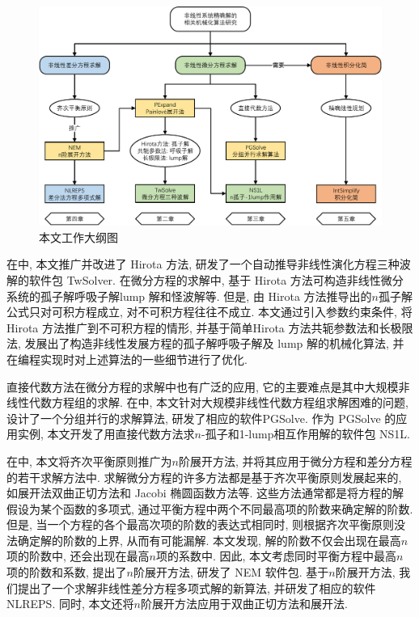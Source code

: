 \begin{figure}[htbp]
\includegraphics[width=\textwidth]{fig/outline.pdf}
\caption{本文工作大纲图}\label{outline}
\end{figure}

在中, 本文推广并改进了 Hirota 方法, 研发了一个自动推导非线性演化方程三种波解的软件包 TwSolver. 在微分方程的求解中, 基于 Hirota 方法可构造非线性微分系统的孤子解\D 呼吸子解\D lump 解和怪波解等. 但是, 由 Hirota 方法推导出的$n$孤子解公式只对可积方程成立, 对不可积方程往往不成立. 本文通过引入参数约束条件, 将 Hirota 方法推广到不可积方程的情形, 并基于简单Hirota 方法\D 共轭参数法和长极限法, 发展出了构造非线性发展方程的孤子解\D 呼吸子解及 lump 解的机械化算法, 并在编程实现时对上述算法的一些细节进行了优化. 

直接代数方法在微分方程的求解中也有广泛的应用, 它的主要难点是其中大规模非线性代数方程组的求解. 在中, 本文针对大规模非线性代数方程组求解困难的问题, 设计了一个分组并行的求解算法, 研发了相应的软件PGSolve. 作为 PGSolve 的应用实例, 本文开发了用直接代数方法求$n$-孤子和1-lump相互作用解的软件包 NS1L. 

在中, 本文将齐次平衡原则推广为$n$阶展开方法, 并将其应用于微分方程和差分方程的若干求解方法中. 求解微分方程的许多方法都是基于齐次平衡原则发展起来的, 如\Painleve{}展开法\D 双曲正切方法和 Jacobi 椭圆函数方法等. 这些方法通常都是将方程的解假设为某个函数的多项式, 通过平衡方程中两个不同最高项的阶数来确定解的阶数. 但是, 当一个方程的各个最高次项的阶数的表达式相同时, 则根据齐次平衡原则没法确定解的阶数的上界, 从而有可能漏解. 本文发现, 解的阶数不仅会出现在最高$n$项的阶数中, 还会出现在最高$n$项的系数中. 因此, 本文考虑同时平衡方程中最高$n$项的阶数和系数, 提出了$n$阶展开方法, 研发了 NEM 软件包. 基于$n$阶展开方法, 我们提出了一个求解非线性差分方程多项式解的新算法, 并研发了相应的软件 NLREPS. 同时, 本文还将$n$阶展开方法应用于双曲正切方法和\Painleve{}展开法. 

